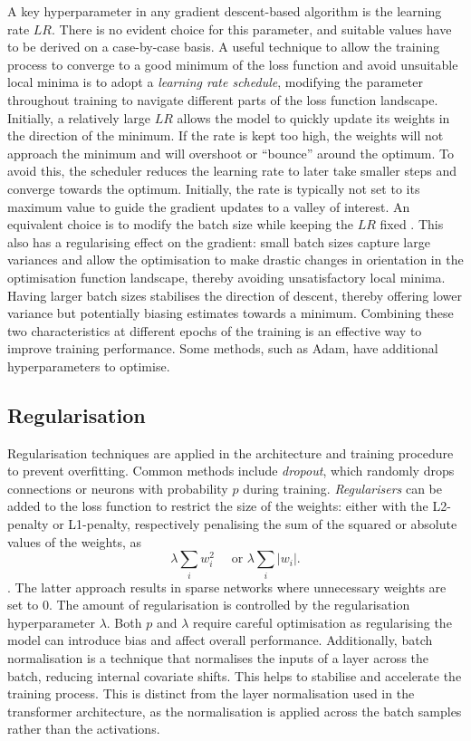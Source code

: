 A key hyperparameter in any gradient descent-based algorithm is the learning rate $LR$. There is no evident choice for this parameter, and suitable values have to be derived on a case-by-case basis. A useful technique to allow the training process to converge to a good minimum of the loss function and avoid unsuitable local minima is to adopt a \textit{learning rate schedule}, modifying the parameter throughout training to navigate different parts of the loss function landscape. Initially, a relatively large $LR$ allows the model to quickly update its weights in the direction of the minimum. If the rate is kept too high, the weights will not approach the minimum and will overshoot or ``bounce'' around the optimum. To avoid this, the scheduler reduces the learning rate to later take smaller steps and converge towards the optimum. Initially, the rate is typically not set to its maximum value to guide the gradient updates to a valley of interest. An equivalent choice is to modify the batch size while keeping the $LR$ fixed \cite{smith2017decay}. This also has a regularising effect on the gradient: small batch sizes capture large variances and allow the optimisation to make drastic changes in orientation in the optimisation function landscape, thereby avoiding unsatisfactory local minima. Having larger batch sizes stabilises the direction of descent, thereby offering lower variance but potentially biasing estimates towards a minimum. Combining these two characteristics at different epochs of the training is an effective way to improve training performance. Some methods, such as Adam, have additional hyperparameters to optimise.

\subsection{Regularisation}
Regularisation techniques are applied in the architecture and training procedure to prevent overfitting. Common methods include \textit{dropout}, which randomly drops connections or neurons with probability $p$ during training. \textit{Regularisers} can be added to the loss function to restrict the size of the weights: either with the L2-penalty or L1-penalty, respectively penalising the sum of the squared or absolute values of the weights, as \[\lambda \sum_i w_i^2 \quad \text{ or } \lambda \sum_i |w_i|.\]. The latter approach results in sparse networks where unnecessary weights are set to 0. The amount of regularisation is controlled by the regularisation hyperparameter $\lambda$. Both $p$ and $\lambda$ require careful optimisation as regularising the model can introduce bias and affect overall performance. Additionally, batch normalisation is a technique that normalises the inputs of a layer across the batch, reducing internal covariate shifts. This helps to stabilise and accelerate the training process. This is distinct from the layer normalisation used in the transformer architecture, as the normalisation is applied across the batch samples rather than the activations. 

